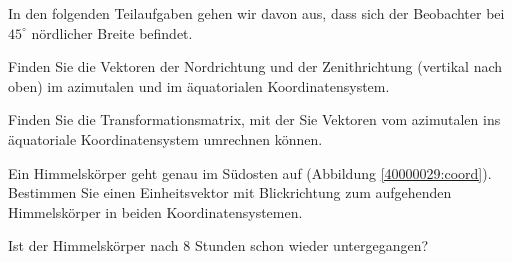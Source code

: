 In den folgenden Teilaufgaben gehen wir davon aus, dass sich der Beobachter
bei $45^\circ$ nördlicher Breite befindet.
\begin{teilaufgaben}
\item Finden Sie die Vektoren der Nordrichtung und der Zenithrichtung
(vertikal nach oben) im azimutalen und im äquatorialen Koordinatensystem.
\item Finden Sie die Transformationsmatrix, mit der Sie Vektoren
vom azimutalen ins äquatoriale Koordinatensystem umrechnen können.
\item Ein Himmelskörper geht genau im Südosten auf
(Abbildung \ref{40000029:coord}).
Bestimmen Sie einen Einheitsvektor mit Blickrichtung zum
aufgehenden Himmelskörper in beiden Koordinatensystemen.
\item Ist der Himmelskörper nach 8 Stunden schon wieder untergegangen?
\end{teilaufgaben}


